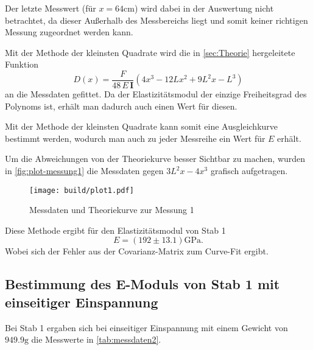 Der letzte Messwert (für $x = 64\si{\centi\meter}$) wird dabei in der Auswertung nicht
betrachtet, da dieser Außerhalb des Messbereichs liegt und somit keiner richtigen Messung 
zugeordnet werden kann.

Mit der Methode der kleinsten Quadrate wird die in \autoref{sec:Theorie} hergeleitete
Funktion 
\begin{equation}
	D(x) = \frac{F}{48 \, E \, \mathbf{I}} \left(4x^3 - 12Lx^2 + 9L^2x - L^3 \right)
\end{equation}
an die Messdaten gefittet. Da der Elastizitätsmodul der einzige
Freiheitsgrad des Polynoms ist, erhält man dadurch auch einen Wert für diesen.

Mit der Methode der kleinsten Quadrate kann somit eine Ausgleichkurve bestimmt
werden, wodurch man auch zu jeder Messreihe ein Wert für $E$ erhält.

Um die Abweichungen von der Theoriekurve besser Sichtbar zu machen, 
wurden in \autoref{fig:plot-messung1} die Messdaten gegen $3L^2x - 4x^3$ grafisch 
aufgetragen.
\begin{figure}[H]
	\centering
	\texttt{[image: build/plot1.pdf]}
	\caption{Messdaten und Theoriekurve zur Messung 1}
	\label{fig:plot-messung1}
\end{figure}

Diese Methode ergibt für den Elastizitätsmodul von Stab 1
\begin{equation}
	E = (192 \pm 13.1) \si{\giga\pascal}.
	\label{eqn:E-messung1}
\end{equation}
Wobei sich der Fehler aus der Covarianz-Matrix zum Curve-Fit ergibt.

\subsection{Bestimmung des E-Moduls von Stab 1 mit einseitiger Einspannung}
\label{sec:messung2}

Bei Stab 1 ergaben sich bei einseitiger Einspannung 
mit einem Gewicht von $949.9 \si{\gram}$ 
die Messwerte in \autoref{tab:messdaten2}.


